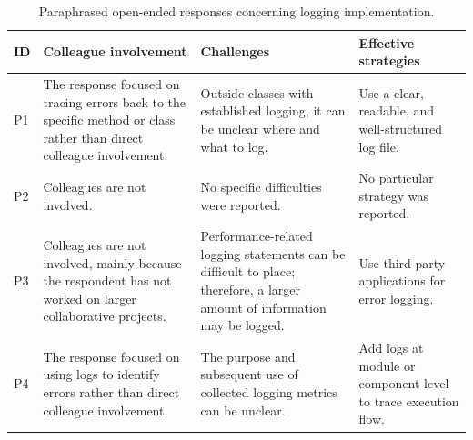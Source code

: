 \vspace{0.3em}

\begin{table}[H]
    \centering
    \scriptsize

    \caption{Paraphrased open-ended responses concerning logging
    implementation.}
    \label{tab:appendix-logging-open-responses}

    \begin{tabularx}{\textwidth}{
        @{}
        >{\centering\arraybackslash}p{}
        >{\RaggedRight\arraybackslash}p{}
        >{\RaggedRight\arraybackslash}p{}
        >{\RaggedRight\arraybackslash}X
        @{}
    }

        \toprule

        \textbf{ID} &
        \textbf{Colleague involvement} &
        \textbf{Challenges} &
        \textbf{Effective strategies} \\

        \midrule

        P1 &
        The response focused on tracing errors back to the specific
        method or class rather than direct colleague involvement. &
        Outside classes with established logging, it can be unclear
        where and what to log. &
        Use a clear, readable, and well-structured log file. \\

        \addlinespace[0.2em]

        P2 &
        Colleagues are not involved. &
        No specific difficulties were reported. &
        No particular strategy was reported. \\

        \addlinespace[0.2em]

        P3 &
        Colleagues are not involved, mainly because the respondent has
        not worked on larger collaborative projects. &
        Performance-related logging statements can be difficult to place;
        therefore, a larger amount of information may be logged. &
        Use third-party applications for error logging. \\

        \addlinespace[0.2em]

        P4 &
        The response focused on using logs to identify errors rather than
        direct colleague involvement. &
        The purpose and subsequent use of collected logging metrics can
        be unclear. &
        Add logs at module or component level to trace execution flow. \\


\end{tabularx}
\end{table}
